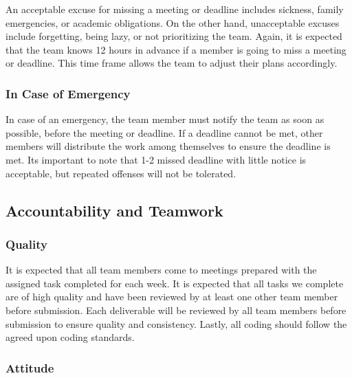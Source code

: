 \documentclass{article}
\begin{document}
\raggedright
An acceptable excuse for missing a meeting or deadline includes sickness, family
emergencies, or academic obligations. On the other hand, unacceptable excuses include
forgetting, being lazy, or not prioritizing the team. Again, it is expected that the team
knows 12 hours in advance if a member is going to miss a meeting or deadline. This time
frame allows the team to adjust their plans accordingly.

\subsubsection*{In Case of Emergency}


\raggedright
In case of an emergency, the team member must notify the team as soon as possible, before
the meeting or deadline. If a deadline cannot be met, other members will distribute 
the work among themselves to ensure the deadline is met. Its important to note that 
1-2 missed deadline with little notice is acceptable, but repeated offenses will not 
be tolerated.

\subsection*{Accountability and Teamwork}

\subsubsection*{Quality} 


\raggedright
It is expected that all team members come to meetings prepared with the assigned
task completed for each week. It is expected that all tasks we complete are of high quality
and have been reviewed by at least one other team member before submission. Each
deliverable will be reviewed by all team members before submission to ensure quality 
and consistency. Lastly, all coding should follow the agreed upon coding standards.


\subsubsection*{Attitude}
\end{document}
